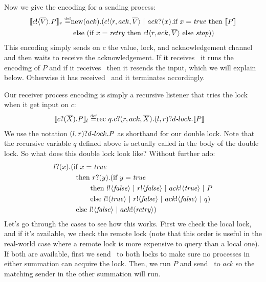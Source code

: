 Now we give the encoding for a sending process:
\begin{equation*}\begin{split}
	\llbracket{ \ensuremath{{c}!\langle{ \ensuremath{\overline{V}} }\rangle.} P}\rrbracket_r \overset{\mbox{\tiny{def}}}{=} & \text{new}({ack}).({c}!\langle{r,ack, \ensuremath{\overline{V}} }\rangle \ |\  {ack}?({x}). \text{if } {x= \ensuremath{\text{\emph{true}}} } \text{ then } \llbracket{P}\rrbracket \\
	&\text{ else } (\text{if } {x= \ensuremath{\text{\emph{retry}}} } \text{ then } {c}!\langle{r,ack, \ensuremath{\overline{V}} }\rangle \text{ else } \mbox{\emph{stop}}))
\end{split}\end{equation*}
This encoding simply sends on $c$ the value, lock, and acknowledgement channel and then waits to receive the acknowledgement.  
If it receives \ptrue\ it runs the encoding of $P$ and if it receives \pretry\ then it resends the input, which we will explain below.  Otherwise it has received \pfalse\ and it terminates accordingly.

Our receiver process encoding is simply a recursive listener that tries the lock when it get input on $c$:
\begin{equation*}\begin{split}
	\llbracket{ \ensuremath{{c}?({\overline{X}}).} P}\rrbracket_l \overset{\mbox{\tiny{def}}}{=} & \text{rec }{q}.{c}?({r,ack,\overline{X}}). (l,r)?d\mbox{\emph{-}}lock.\llbracket{P}\rrbracket
\end{split}\end{equation*}
We use the notation $(l,r)?d\mbox{\emph{-}}lock.P$ as shorthand for our double lock.
Note that the recursive variable $q$ defined above is actually called in the body of the double lock.
So what does this double lock look like?  Without further ado:
\begin{equation*}\begin{split}
	{l}?({x}).(&\text{if } {x= \ensuremath{\text{\emph{true}}} }\\
	&\text{ then } {r}?({y}). (\text{if } {y= \ensuremath{\text{\emph{true}}} }\\
	&\ \ \ \ \ \ \text{ then } {l}!\langle{ \ensuremath{\text{\emph{false}}} }\rangle \ |\  {r}!\langle{ \ensuremath{\text{\emph{false}}} }\rangle \ |\  {ack}!\langle{ \ensuremath{\text{\emph{true}}} }\rangle \ |\  P\\
	&\ \ \ \ \ \ \text{ else } {l}!\langle{ \ensuremath{\text{\emph{true}}} }\rangle \ |\  {r}!\langle{ \ensuremath{\text{\emph{false}}} }\rangle \ |\  {ack}!\langle{ \ensuremath{\text{\emph{false}}} }\rangle \ |\  q)\\
	&\text{ else }{l}!\langle{ \ensuremath{\text{\emph{false}}} }\rangle \ |\  {ack}!\langle{ \ensuremath{\text{\emph{retry}}} }\rangle)\\
\end{split}\end{equation*}%
Let's go through the cases to see how this works.  
First we check the local lock, and if it's available, we check the remote lock (note that this order is useful in the real-world case where a remote lock is more expensive to query than a local one).  
If both are available, first we send \pfalse\ to both locks to make sure no processes in either summation can acquire the lock.  
Then, we run $P$ and send \ptrue\ to $ack$ so the matching sender in the other summation will run.

